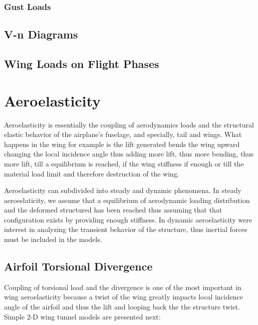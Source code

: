 \subsubsection{Gust Loads}


\subsection{V-n Diagrams}

\subsection{Wing Loads on Flight Phases}


















\newpage
\section{Aeroelasticity}
Aeroelasticity is essentially the coupling of aerodynamics loads and the structural elastic behavior of the airplane's fuselage, and specially, tail and wings. What happens in the wing for example is the lift generated bends the wing upward changing the local incidence angle thus adding more lift, thus more bending, thus more lift, till a equilibrium is reached, if the wing stiffness if enough or till the material load limit and therefore destruction of the wing.

Aeroelasticity can subdivided into steady and dynamic phenomena. In steady
aeroeslaticity, we assume that a equilibrium of aerodynamic loading distribution and the deformed structured has been reached thus assuming that that configuration exists by providing enough stiffness.  In dynamic aeroelasticity were interest in analyzing the transient behavior of the structure, thus inertial forces must be included in the models.

\subsection{Airfoil Torsional Divergence}
Coupling of torsional load and the divergence is one of the most important in wing aeroelasticity because a twist of the wing greatly impacts local incidence angle of the airfoil and thus the lift and looping back the the structure twist.
Simple 2-D wing tunnel models are presented next:

